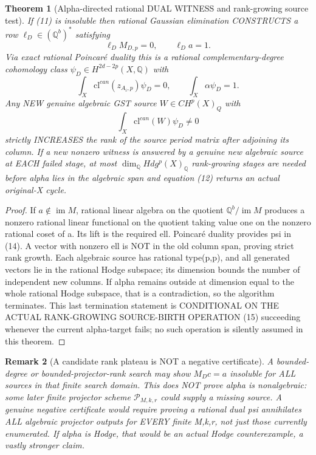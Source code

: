 \documentclass[11pt]{article}
\newtheorem{theorem}{Theorem}[section]
\newtheorem{remark}[theorem]{Remark}
\begin{document}
\begin{theorem}[Alpha-directed rational DUAL WITNESS and rank-growing source test]
If (11) is insoluble then rational Gaussian
elimination CONSTRUCTS a row
\(\ell_D\in(\mathbb Q^b)^*\) satisfying
\[
 \boxed{\ell_D M_{D,p}=0,\qquad
                    \ell_D a=1.}               \tag{13}
\]
Via exact rational Poincaré duality this is
a rational complementary-degree cohomology class
\(\psi_D\in H^{2d-2p}(X,\mathbb Q)\)
with
\[
 \int_X \mathrm{cl}^{can}(z_{A_i,p})\psi_D=0,
 \qquad \int_X\alpha\psi_D=1.                 \tag{14}
\]
Any NEW genuine algebraic GST source \(W\in CH^p(X)_Q\)
with
\[
 \boxed{\int_X\mathrm{cl}^{can}(W)\psi_D\ne0}   \tag{15}
\]
strictly INCREASES the rank of the source period
matrix after adjoining its column.
If a new nonzero witness is answered by a genuine
new algebraic source at EACH failed stage,
at most \(\dim_\mathbb Q Hdg^p(X)_\mathbb Q\)
rank-growing stages are needed before alpha lies
in the algebraic span and equation (12) returns
an actual original-X cycle.
\end{theorem}
\begin{proof}
If \(a\notin\operatorname{im}M\),
rational linear algebra on the quotient
\(\mathbb Q^b/\operatorname{im}M\)
produces a nonzero rational linear functional
on the quotient taking value one on the
nonzero rational coset of a.
Its lift is the required ell.
Poincaré duality provides psi in (14).
A vector with nonzero ell is NOT in the
old column span, proving strict rank growth.
Each algebraic source has rational type(p,p),
and all generated vectors lie in the
rational Hodge subspace; its dimension bounds
the number of independent new columns.
If alpha remains outside at dimension equal to
the whole rational Hodge subspace, that is a
contradiction, so the algorithm terminates.
This last termination statement is CONDITIONAL
ON THE ACTUAL RANK-GROWING SOURCE-BIRTH
OPERATION (15) succeeding whenever the
current alpha-target fails; no such operation
is silently assumed in this theorem.
\end{proof}

\begin{remark}[A candidate rank plateau is NOT a negative certificate]
A bounded-degree or bounded-projector-rank search
may show \(M_D c=a\) insoluble for ALL sources
in that finite search domain. This does NOT prove
alpha is nonalgebraic: some later finite
projector scheme \(\mathcal P_{M,k,r}\) could
supply a missing source. A genuine negative
certificate would require proving a rational dual
psi annihilates ALL algebraic projector outputs
for EVERY finite M,k,r, not just those currently
enumerated. If alpha is Hodge, that would be an
actual Hodge counterexample, a vastly stronger claim.
\end{remark}
\end{document}
